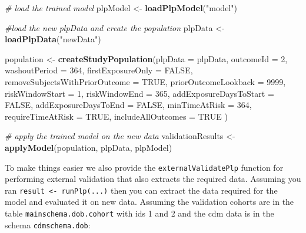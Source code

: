 \documentclass[11pt]{book}
\newenvironment{Shaded}{\begin{snugshade}}{\end{snugshade}}
\newcommand{\KeywordTok}[1]{\textcolor[rgb]{0.13,0.29,0.53}{\textbf{#1}}}
\newcommand{\DataTypeTok}[1]{\textcolor[rgb]{0.13,0.29,0.53}{#1}}
\newcommand{\DecValTok}[1]{\textcolor[rgb]{0.00,0.00,0.81}{#1}}
\newcommand{\StringTok}[1]{\textcolor[rgb]{0.31,0.60,0.02}{#1}}
\newcommand{\CommentTok}[1]{\textcolor[rgb]{0.56,0.35,0.01}{\textit{#1}}}
\newcommand{\OtherTok}[1]{\textcolor[rgb]{0.56,0.35,0.01}{#1}}
\newcommand{\NormalTok}[1]{#1}
\begin{document}
\begin{Shaded}
\begin{Highlighting}[]
\CommentTok{# load the trained model}
\NormalTok{plpModel <-}\StringTok{ }\KeywordTok{loadPlpModel}\NormalTok{(}\StringTok{"model"}\NormalTok{)}

\CommentTok{#load the new plpData and create the population}
\NormalTok{plpData <-}\StringTok{ }\KeywordTok{loadPlpData}\NormalTok{(}\StringTok{"newData"}\NormalTok{)}

\NormalTok{population <-}\StringTok{ }\KeywordTok{createStudyPopulation}\NormalTok{(}\DataTypeTok{plpData =}\NormalTok{ plpData,}
                                    \DataTypeTok{outcomeId =} \DecValTok{2}\NormalTok{,}
                                    \DataTypeTok{washoutPeriod =} \DecValTok{364}\NormalTok{,}
                                    \DataTypeTok{firstExposureOnly =} \OtherTok{FALSE}\NormalTok{,}
                                    \DataTypeTok{removeSubjectsWithPriorOutcome =} \OtherTok{TRUE}\NormalTok{,}
                                    \DataTypeTok{priorOutcomeLookback =} \DecValTok{9999}\NormalTok{,}
                                    \DataTypeTok{riskWindowStart =} \DecValTok{1}\NormalTok{,}
                                    \DataTypeTok{riskWindowEnd =} \DecValTok{365}\NormalTok{,}
                                    \DataTypeTok{addExposureDaysToStart =} \OtherTok{FALSE}\NormalTok{,}
                                    \DataTypeTok{addExposureDaysToEnd =} \OtherTok{FALSE}\NormalTok{,}
                                    \DataTypeTok{minTimeAtRisk =} \DecValTok{364}\NormalTok{,}
                                    \DataTypeTok{requireTimeAtRisk =} \OtherTok{TRUE}\NormalTok{,}
                                    \DataTypeTok{includeAllOutcomes =} \OtherTok{TRUE}
\NormalTok{)}

\CommentTok{# apply the trained model on the new data}
\NormalTok{validationResults <-}\StringTok{ }\KeywordTok{applyModel}\NormalTok{(population, plpData, plpModel)}
\end{Highlighting}
\end{Shaded}

To make things easier we also provide the \texttt{externalValidatePlp}
function for performing external validation that also extracts the
required data. Assuming you ran
\texttt{result\ \textless{}-\ runPlp(...)} then you can extract the data
required for the model and evaluated it on new data. Assuming the
validation cohorts are in the table \texttt{mainschema.dob.cohort} with
ids 1 and 2 and the cdm data is in the schema \texttt{cdmschema.dob}:
\end{document}

